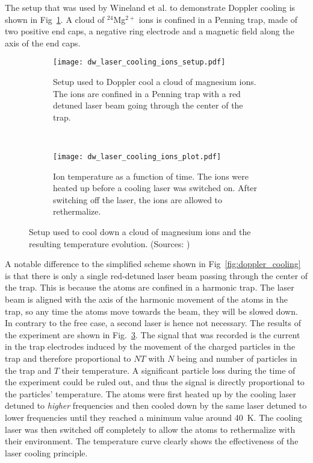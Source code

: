 The setup that was used by Wineland et al. to demonstrate Doppler cooling is
shown in Fig~\ref{fig:cooling_setup}. A cloud of $^{24}$Mg$^{2+}$ ions is confined
in a Penning trap, made of two positive end caps, a negative ring electrode and a
magnetic field along the axis of the end caps.
\begin{figure}[t]
  \centering
  \begin{subfigure}[t]{0.48\linewidth} 
    \centering
    \texttt{[image: dw\_laser\_cooling\_ions\_setup.pdf]}
    \caption{Setup used to Doppler cool a  cloud of magnesium ions. The ions are
    confined in a Penning trap with a red detuned laser beam going through
  the center of the trap.}
    \label{fig:cooling_setup}
  \end{subfigure}
  ~
  \begin{subfigure}[t]{0.48\linewidth} 
    \centering
    \texttt{[image: dw\_laser\_cooling\_ions\_plot.pdf]}
    \caption{Ion temperature as a function of time. The ions were heated up
    before a cooling laser was switched on. After switching off the laser, the
  ions are allowed to rethermalize.}
    \label{fig:cooling_results}
  \end{subfigure}
  \caption{Setup used to cool down a cloud of magnesium ions and the resulting
    temperature evolution. (Sources: \cite{wineland2012nobel,wineland1978radiation})}
\end{figure}
A notable difference to the simplified scheme shown in
Fig~\ref{fig:doppler_cooling} is that there is only a single red-detuned laser
beam passing through the center of the trap. This is because the atoms are
confined in a harmonic trap. The laser beam is aligned with the axis of the
harmonic movement of the atoms in the trap, so any time the atoms move towards
the beam, they will be slowed down. In contrary to the free case, a second laser
is hence not necessary. The results of the experiment are shown in
Fig.~\ref{fig:cooling_results}. The signal that was recorded is the current
in the trap electrodes induced by the movement of the charged particles in the
trap and therefore proportional to $NT$ with $N$ being and number of particles
in the trap and $T$ their temperature. A significant particle loss during the
time of the experiment could be ruled out, and thus the signal is directly
proportional to the particles' temperature. The atoms were first heated up by
the cooling laser detuned to {\em higher} frequencies and then cooled down by
the same laser detuned to lower frequencies until they reached a minimum value
around \SI{40}{K}. The cooling laser was then switched off completely to allow
the atoms to rethermalize with their environment. The temperature curve clearly
shows the effectiveness of the laser cooling principle.

